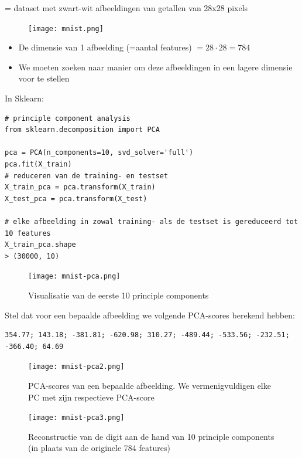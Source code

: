 \documentclass{article}
\begin{document}
= dataset met zwart-wit afbeeldingen van getallen van 28x28 pixels

\begin{figure}[H]
    \centering
    \texttt{[image: mnist.png]}
\end{figure}

\begin{itemize}
    \item De dimensie van 1 afbeelding (=aantal features) $= 28\cdot 28 = 784$
    \item We moeten zoeken naar manier om deze afbeeldingen in een lagere dimensie voor te stellen
\end{itemize}

In Sklearn:

\begin{verbatim}
# principle component analysis
from sklearn.decomposition import PCA

pca = PCA(n_components=10, svd_solver='full')
pca.fit(X_train)
# reduceren van de training- en testset
X_train_pca = pca.transform(X_train)
X_test_pca = pca.transform(X_test)

# elke afbeelding in zowal training- als de testset is gereduceerd tot 10 features
X_train_pca.shape
> (30000, 10)
\end{verbatim}

\begin{figure}[H]
    \centering
    \texttt{[image: mnist-pca.png]}
    \caption{Visualisatie van de eerste 10 principle components}
\end{figure}

Stel dat voor een bepaalde afbeelding we volgende PCA-scores berekend hebben:

\begin{verbatim}
354.77; 143.18; -381.81; -620.98; 310.27; -489.44; -533.56; -232.51; -366.40; 64.69
\end{verbatim}

\begin{figure}[H]
    \centering
    \texttt{[image: mnist-pca2.png]}
    \caption{PCA-scores van een bepaalde afbeelding. We vermenigvuldigen elke PC met zijn respectieve PCA-score}
\end{figure}

\begin{figure}[H]
    \centering
    \texttt{[image: mnist-pca3.png]}
    \caption{Reconstructie van de digit aan de hand van 10 principle components (in plaats van de originele 784 features)}
\end{figure}
\end{document}
